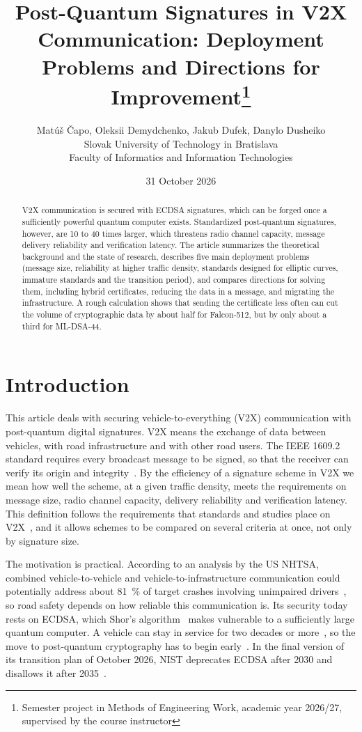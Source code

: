 \documentclass[10pt,twoside,a4paper]{article}
\title{Post-Quantum Signatures in V2X Communication: Deployment Problems and Directions for Improvement\thanks{Semester project in Methods of Engineering Work, academic year 2026/27, supervised by the course instructor}}
\author{Mat{\'u}{\v s} {\v C}apo, Oleksii Demydchenko, Jakub Dufek, Danylo Dusheiko\\[2pt]
	{\small Slovak University of Technology in Bratislava}\\
	{\small Faculty of Informatics and Information Technologies}
	}
\date{\small 31 October 2026}
\begin{document}
\maketitle

\begin{abstract}
V2X communication is secured with ECDSA signatures, which can be forged once a sufficiently powerful quantum computer exists. Standardized post-quantum signatures, however, are 10 to 40 times larger, which threatens radio channel capacity, message delivery reliability and verification latency. The article summarizes the theoretical background and the state of research, describes five main deployment problems (message size, reliability at higher traffic density, standards designed for elliptic curves, immature standards and the transition period), and compares directions for solving them, including hybrid certificates, reducing the data in a message, and migrating the infrastructure. A rough calculation shows that sending the certificate less often can cut the volume of cryptographic data by about half for Falcon-512, but by only about a third for ML-DSA-44.
\end{abstract}

\section{Introduction}

This article deals with securing vehicle-to-everything (V2X) communication with post-quantum digital signatures. V2X means the exchange of data between vehicles, with road infrastructure and with other road users. The IEEE 1609.2 standard requires every broadcast message to be signed, so that the receiver can verify its origin and integrity~\cite{IEEE:1609.2}. By the efficiency of a signature scheme in V2X we mean how well the scheme, at a given traffic density, meets the requirements on message size, radio channel capacity, delivery reliability and verification latency. This definition follows the requirements that standards and studies place on V2X~\cite{Abrar:2026}, and it allows schemes to be compared on several criteria at once, not only by signature size.

The motivation is practical. According to an analysis by the US NHTSA, combined vehicle-to-vehicle and vehicle-to-infrastructure communication could potentially address about 81~\% of target crashes involving unimpaired drivers~\cite{Najm:2010}, so road safety depends on how reliable this communication is. Its security today rests on ECDSA, which Shor's algorithm~\cite{Shor:1994} makes vulnerable to a sufficiently large quantum computer. A vehicle can stay in service for two decades or more~\cite{Yoshizawa:2022}, so the move to post-quantum cryptography has to begin early~\cite{Mosca:2018}. In the final version of its transition plan of October 2026, NIST deprecates ECDSA after 2030 and disallows it after 2035~\cite{NIST:IR8547}.
\end{document}
